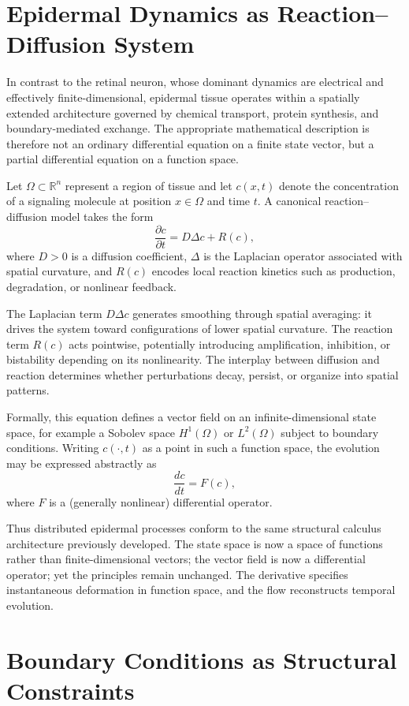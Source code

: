\documentclass[12pt]{book}
\begin{document}
\section{Epidermal Dynamics as Reaction--Diffusion System}

In contrast to the retinal neuron, whose dominant dynamics are electrical
and effectively finite-dimensional, epidermal tissue operates within a
spatially extended architecture governed by chemical transport, protein
synthesis, and boundary-mediated exchange. The appropriate mathematical
description is therefore not an ordinary differential equation on a
finite state vector, but a partial differential equation on a function
space.

Let $\Omega \subset \mathbb{R}^n$ represent a region of tissue and let
$c(x,t)$ denote the concentration of a signaling molecule at position
$x \in \Omega$ and time $t$. A canonical reaction--diffusion model takes
the form
\[
\frac{\partial c}{\partial t}
=
D \Delta c
+
R(c),
\]
where $D>0$ is a diffusion coefficient, $\Delta$ is the Laplacian
operator associated with spatial curvature, and $R(c)$ encodes local
reaction kinetics such as production, degradation, or nonlinear
feedback.

The Laplacian term $D \Delta c$ generates smoothing through spatial
averaging: it drives the system toward configurations of lower spatial
curvature. The reaction term $R(c)$ acts pointwise, potentially
introducing amplification, inhibition, or bistability depending on its
nonlinearity. The interplay between diffusion and reaction determines
whether perturbations decay, persist, or organize into spatial patterns.

Formally, this equation defines a vector field on an infinite-dimensional
state space, for example a Sobolev space $H^1(\Omega)$ or $L^2(\Omega)$
subject to boundary conditions. Writing $c(\cdot,t)$ as a point in such
a function space, the evolution may be expressed abstractly as
\[
\frac{dc}{dt} = F(c),
\]
where $F$ is a (generally nonlinear) differential operator.

Thus distributed epidermal processes conform to the same structural
calculus architecture previously developed. The state space is now a
space of functions rather than finite-dimensional vectors; the vector
field is now a differential operator; yet the principles remain
unchanged. The derivative specifies instantaneous deformation in
function space, and the flow reconstructs temporal evolution.

\section{Boundary Conditions as Structural Constraints}
\end{document}
